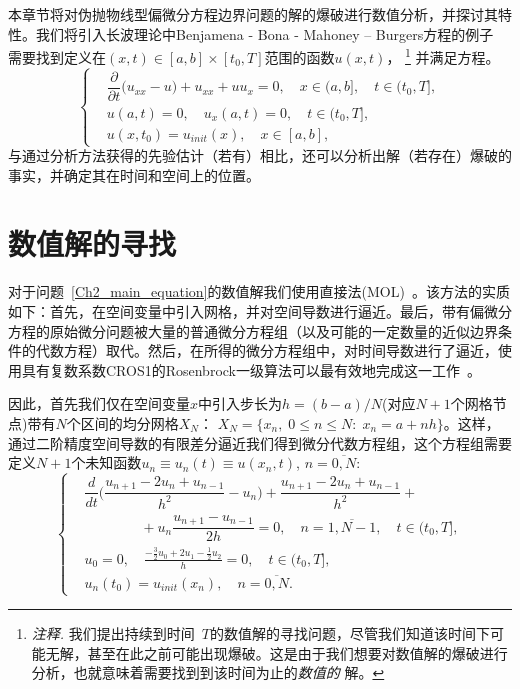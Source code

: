 \documentclass[twoside]{book}
\begin{document}
\begin{CJK*}{GBK}{song}
本章节将对伪抛物线型偏微分方程边界问题的解的爆破进行数值分析，并探讨其特性。我们将引入长波理论中Benjamena - Bona - Mahoney – Burgers方程的例子 ~\cite{Panin_1} 需要找到定义在$(x,t) \in [a,b] \times [t_0,T]$范围的函数$u(x,t)$， \footnote{\emph{注释.} 我们提出持续到时间~$T$的数值解的寻找问题，尽管我们知道该时间下可能无解，甚至在此之前可能出现爆破。这是由于我们想要对数值解的爆破进行分析，也就意味着需要找到到该时间为止的\emph{数值的\/} 解。} 并满足方程。
\begin{equation}
\label{Ch2_main_equation}
    \left\{
        \begin{aligned}
            &\dfrac{\partial}{\partial t} \big(u_{xx} - u\big) + u_{xx} + u u_x = 0, \quad x \in (a,b], \quad t \in (t_0,T], \\
            &u(a,t) = 0, \quad u_x(a,t) = 0, \quad t \in (t_0,T], \\
            &u(x,t_0) = u_{init}(x), \quad x \in [a,b],
        \end{aligned}
    \right.
\end{equation}
与通过分析方法获得的先验估计（若有）相比，还可以分析出解（若存在）爆破的事实，并确定其在时间和空间上的位置。


\section{数值解的寻找} \label{Ch_2_Numerical_solving}

对于问题~\eqref{Ch2_main_equation}的数值解我们使用直接法(MOL)~\cite{Kalitkin&Ko_1,Kalitkin,Hairer&Wanner}。该方法的实质如下：首先，在空间变量中引入网格，并对空间导数进行逼近。最后，带有偏微分方程的原始微分问题被大量的普通微分方程组（以及可能的一定数量的近似边界条件的代数方程）取代。然后，在所得的微分方程组中，对时间导数进行了逼近，使用具有复数系数CROS1的Rosenbrock一级算法可以最有效地完成这一工作~\cite{Kalitkin&Ko_1,Rosenbrock}。

因此，首先我们仅在空间变量$x$中引入步长为$h = (b - a)/N$(对应$N + 1$个网格节点)带有$N$个区间的均分网格$X_N$： $X_N = \{x_n, \; 0 \leqslant n \leqslant N: \; x_n = a + n h\}$。这样，通过二阶精度空间导数的有限差分逼近我们得到微分代数方程组，这个方程组需要定义$N + 1$个未知函数$u_{n} \equiv  u_{n}(t) \equiv u(x_n,t)$, $n = \overline{0,N}$:
\begin{equation*}
    \left\{
    \begin{aligned}
        &\dfrac{d}{d t} \Big(\dfrac{u_{n + 1} - 2u_n + u_{n - 1}}{h^2} - u_n\Big) + \dfrac{u_{n + 1} - 2u_n + u_{n - 1}}{h^2} + \\
        &\qquad\qquad + u_n \dfrac{u_{n + 1} - u_{n - 1}}{2h} = 0, \quad n = \overline{1,N - 1}, \quad t \in (t_0,T], \\
        &u_0 = 0, \quad \frac{-\frac{3}{2}u_0 + 2u_1 - \frac{1}{2}u_2}{h} = 0, \quad t \in (t_0,T], \\
        &u_n(t_0) = u_{init}(x_n), \quad n = \overline{0,N}.
    \end{aligned}
    \right.
\end{equation*}


\end{CJK*}
\end{document}
